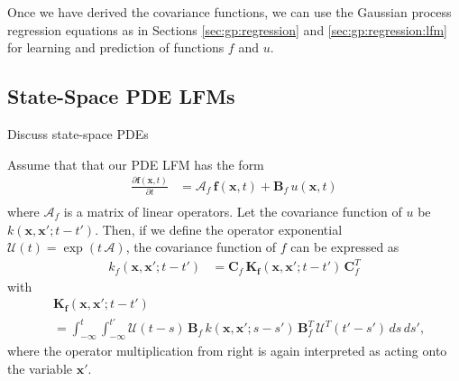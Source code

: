 \documentclass[journal]{IEEEtran}
\newcommand{\simo}[1]{{\color{red}#1}}
\begin{document}
Once we have derived the covariance functions, we can use the Gaussian process regression equations as in Sections \ref{sec:gp:regression} and \ref{sec:gp:regression:lfm} for learning and prediction of functions $f$ and $u$.

\subsection{State-Space PDE LFMs}

\simo{Discuss state-space PDEs}

Assume that that our PDE LFM has the form
%
\begin{equation}
\begin{split}
  \frac{\partial \mathbf{f}(\mathbf{x},t)}{\partial t}
  &= \mathbf{\mathcal{A}}_f \, \mathbf{f}(\mathbf{x},t) + \mathbf{B}_f \, u(\mathbf{x},t) \\
\end{split}
\end{equation}
%
where $\mathbf{\mathcal{A}}_f$ is a matrix of linear operators. Let the covariance function of $u$ be $k(\mathbf{x},\mathbf{x}';t - t')$. Then, if we define the operator exponential $\mathbf{\mathcal{U}}(t) = \exp(t \, \mathbf{\mathcal{A}})$, the covariance function of $f$ can be expressed as
%
\begin{equation}
\begin{split}
  k_f(\mathbf{x},\mathbf{x}';t-t') &=
  \mathbf{C}_f \, \mathbf{K}_\mathbf{f}(\mathbf{x},\mathbf{x}';t-t') \, \mathbf{C}_f^T
\end{split}
\end{equation}
%
with
%
\begin{equation}
\begin{split}
  &\mathbf{K}_\mathbf{f}(\mathbf{x},\mathbf{x}';t-t')
  \\ &
  =
  \int_{-\infty}^{t} \int_{-\infty}^{t'}
  \mathbf{\mathcal{U}}(t - s) \, \mathbf{B}_f \, k(\mathbf{x},\mathbf{x}';s - s') \,
  \mathbf{B}_f^T \, \mathbf{\mathcal{U}}^T(t' - s') \, ds \, ds',
\end{split}
\label{eq:vfcov}
\end{equation}
%
where the operator multiplication from right is again interpreted as acting onto the variable $\mathbf{x}'$.
\end{document}
